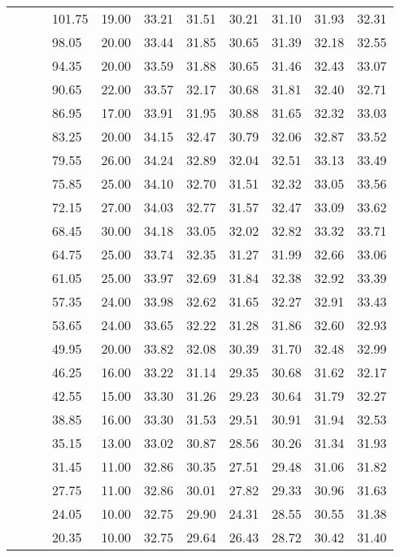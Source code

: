 \begin{longtable}{llllrrrrrrr}
   &  &  & 101.75 & 19.00 & 33.21 & 31.51 & 30.21 & 31.10 & 31.93 & 32.31 \\ 
   &  &  & 98.05 & 20.00 & 33.44 & 31.85 & 30.65 & 31.39 & 32.18 & 32.55 \\ 
   &  &  & 94.35 & 20.00 & 33.59 & 31.88 & 30.65 & 31.46 & 32.43 & 33.07 \\ 
   &  &  & 90.65 & 22.00 & 33.57 & 32.17 & 30.68 & 31.81 & 32.40 & 32.71 \\ 
   &  &  & 86.95 & 17.00 & 33.91 & 31.95 & 30.88 & 31.65 & 32.32 & 33.03 \\ 
   &  &  & 83.25 & 20.00 & 34.15 & 32.47 & 30.79 & 32.06 & 32.87 & 33.52 \\ 
   &  &  & 79.55 & 26.00 & 34.24 & 32.89 & 32.04 & 32.51 & 33.13 & 33.49 \\ 
   &  &  & 75.85 & 25.00 & 34.10 & 32.70 & 31.51 & 32.32 & 33.05 & 33.56 \\ 
   &  &  & 72.15 & 27.00 & 34.03 & 32.77 & 31.57 & 32.47 & 33.09 & 33.62 \\ 
   &  &  & 68.45 & 30.00 & 34.18 & 33.05 & 32.02 & 32.82 & 33.32 & 33.71 \\ 
   &  &  & 64.75 & 25.00 & 33.74 & 32.35 & 31.27 & 31.99 & 32.66 & 33.06 \\ 
   &  &  & 61.05 & 25.00 & 33.97 & 32.69 & 31.84 & 32.38 & 32.92 & 33.39 \\ 
   &  &  & 57.35 & 24.00 & 33.98 & 32.62 & 31.65 & 32.27 & 32.91 & 33.43 \\ 
   &  &  & 53.65 & 24.00 & 33.65 & 32.22 & 31.28 & 31.86 & 32.60 & 32.93 \\ 
   &  &  & 49.95 & 20.00 & 33.82 & 32.08 & 30.39 & 31.70 & 32.48 & 32.99 \\ 
   &  &  & 46.25 & 16.00 & 33.22 & 31.14 & 29.35 & 30.68 & 31.62 & 32.17 \\ 
   &  &  & 42.55 & 15.00 & 33.30 & 31.26 & 29.23 & 30.64 & 31.79 & 32.27 \\ 
   &  &  & 38.85 & 16.00 & 33.30 & 31.53 & 29.51 & 30.91 & 31.94 & 32.53 \\ 
   &  &  & 35.15 & 13.00 & 33.02 & 30.87 & 28.56 & 30.26 & 31.34 & 31.93 \\ 
   &  &  & 31.45 & 11.00 & 32.86 & 30.35 & 27.51 & 29.48 & 31.06 & 31.82 \\ 
   &  &  & 27.75 & 11.00 & 32.86 & 30.01 & 27.82 & 29.33 & 30.96 & 31.63 \\ 
   &  &  & 24.05 & 10.00 & 32.75 & 29.90 & 24.31 & 28.55 & 30.55 & 31.38 \\ 
   &  &  & 20.35 & 10.00 & 32.75 & 29.64 & 26.43 & 28.72 & 30.42 & 31.40 \\ 

\end{longtable}
